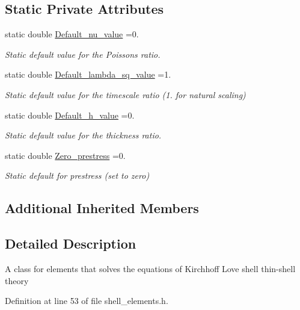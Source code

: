 \subsection*{Static Private Attributes}
\begin{DoxyCompactItemize}
\item 
static double \hyperlink{classoomph_1_1KirchhoffLoveShellEquations_aaf47c41aacd7404d522737fc60ad2972}{Default\+\_\+nu\+\_\+value} =0.
\begin{DoxyCompactList}\small\item\em Static default value for the Poisson\textquotesingle{}s ratio. \end{DoxyCompactList}\item 
static double \hyperlink{classoomph_1_1KirchhoffLoveShellEquations_a62a599a88cfaa4a6b1c67eee80fb2d8b}{Default\+\_\+lambda\+\_\+sq\+\_\+value} =1.
\begin{DoxyCompactList}\small\item\em Static default value for the timescale ratio (1. for natural scaling) \end{DoxyCompactList}\item 
static double \hyperlink{classoomph_1_1KirchhoffLoveShellEquations_a8f671ff89dbfd2fbe3afa9636ac5960a}{Default\+\_\+h\+\_\+value} =0.
\begin{DoxyCompactList}\small\item\em Static default value for the thickness ratio. \end{DoxyCompactList}\item 
static double \hyperlink{classoomph_1_1KirchhoffLoveShellEquations_a746594460f0130626b5be18d6aca48d5}{Zero\+\_\+prestress} =0.
\begin{DoxyCompactList}\small\item\em Static default for prestress (set to zero) \end{DoxyCompactList}\end{DoxyCompactItemize}
\subsection*{Additional Inherited Members}


\subsection{Detailed Description}
A class for elements that solves the equations of Kirchhoff Love shell thin-\/shell theory 

Definition at line 53 of file shell\+\_\+elements.\+h.




